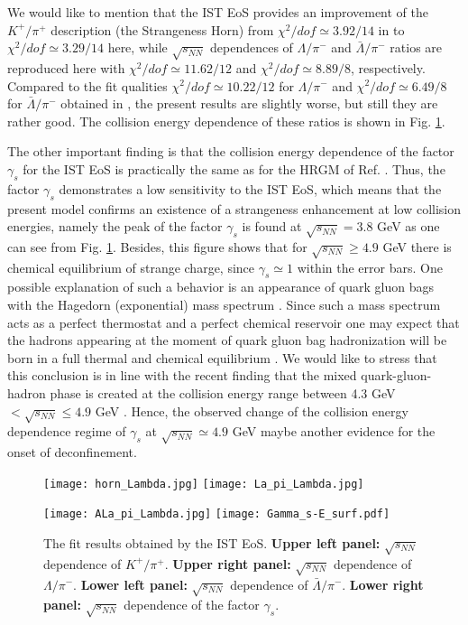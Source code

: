 \documentclass[12pt]{article}
\begin{document}
We would like to mention  that the  IST EoS provides an improvement of     the $K^+/\pi^+$ description (the Strangeness Horn) from $\chi^2/dof \simeq 3.92/14$ in  \cite{Veta14} to $\chi^2/dof \simeq 3.29/14$ here, while $\sqrt{s_{NN}}$ dependences of 
$\Lambda/\pi^-$ and $\bar \Lambda/\pi^-$  ratios are reproduced here with $\chi^2/dof \simeq 11.62/12 $ and 
$\chi^2/dof \simeq 8.89/8$, respectively. Compared to the fit  qualities  $\chi^2/dof \simeq 10.22/12 $   for $\Lambda/\pi^-$ and 
$\chi^2/dof \simeq 6.49/8$ for $\bar \Lambda/\pi^-$  obtained in  \cite{Veta14},  
 the present results are slightly worse, but still they are rather good.  The collision energy dependence of these ratios is shown in  Fig. \ref{Fig7}. 
 
The other important finding is that  the collision energy dependence of the factor $\gamma_s$  for the IST EoS  is practically the same as for the HRGM of Ref. \cite{Veta14}. Thus,  the factor $\gamma_s$  demonstrates a low sensitivity
to the IST EoS, which means that the present model  confirms an existence of  a strangeness enhancement at low collision energies, namely the peak of the  factor $\gamma_s$  is found  at  $\sqrt{s_{NN}} = 3.8$ GeV as one can see from Fig. \ref{Fig7}.
Besides,  this figure shows that for $\sqrt{s_{NN}} \ge  4.9$ GeV there is chemical equilibrium of strange charge, since
$\gamma_s \simeq 1$ within the error bars. One possible explanation of  such a behavior is an appearance of quark gluon bags with the Hagedorn (exponential) mass spectrum \cite{Hagedorn}. Since such a mass spectrum acts as a perfect thermostat and 
a perfect chemical reservoir  \cite{Thermostat1} one may expect that the hadrons appearing   at 
the moment of quark gluon bag  hadronization will be born in a full thermal and chemical equilibrium \cite{Thermostat1,Hstate1,Hstate2,Hstate3}.
We would like to stress that this conclusion is in line with the recent finding that the mixed quark-gluon-hadron phase
is created  at the collision energy range between 4.3 GeV $ < \sqrt{s_{NN}} \le  4.9$ GeV \cite{Bugaev:2014,Bugaev:2015,Bugaev:2016a}.  Hence,  the observed change of the collision energy dependence  regime of  $\gamma_s$  at  
$\sqrt{s_{NN}} \simeq  4.9$ GeV maybe another evidence for the onset of deconfinement. 




\begin{figure}[htbp]
%
\centerline{
\texttt{[image: horn\_Lambda.jpg]}
\hspace*{1.cm}
\texttt{[image: La\_pi\_Lambda.jpg]}   
}
\centerline{
\texttt{[image: ALa\_pi\_Lambda.jpg]}   
\hspace*{1.cm}
\texttt{[image: Gamma\_s-E\_surf.pdf]}	
}	
%
 \caption{The fit results obtained by the IST EoS. {\bf Upper left panel:} $\sqrt{s_{NN}}$  dependence  of  $K^+/\pi^+$. {\bf Upper right panel:} $\sqrt{s_{NN}}$  dependence  of $\Lambda/\pi^{-}$. {\bf Lower left panel:}  $\sqrt{s_{NN}}$  dependence of  $\bar{\Lambda}/\pi^{-}$. {\bf Lower right panel:}  $\sqrt{s_{NN}}$  dependence  of the factor  $\gamma_{s}$.  
}
  \label{Fig7}
\end{figure}
\end{document}
